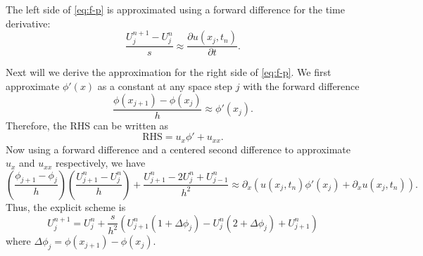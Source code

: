 \documentclass[reqno,11pt]{amsart}
\newcommand{\rhs}{{\text{RHS}}}
\begin{document}
	The left side of \eqref{eq:f-p} is approximated using a forward difference for the time derivative:
	\begin{equation}
		\frac{U_j^{n+1} - U_j^n}{s} \approx \frac{\partial u (x_j,t_n)}{\partial t}.
	\end{equation}
	
	Next will we derive the approximation for the right side of \eqref{eq:f-p}.
	We first approximate $\phi'(x)$ as a constant at any space step $j$ with the forward difference
	\begin{equation}
		\frac{\phi(x_{j+1}) - \phi(x_j)}{h} \approx \phi'(x_j).
	\end{equation}
	Therefore, the RHS can be written as
	\begin{equation*}
		\rhs = u_x \phi' + u_{xx}.
	\end{equation*}
	Now using a forward difference and a centered second difference to approximate $u_x$ and $u_{xx}$ respectively, we have
	\begin{equation}
		\left( \frac{\phi_{j+1} - \phi_j}{h} \right) \left( \frac{U_{j+1}^n - U_j^n}{h} \right) + \frac{U_{j+1}^n - 2 U_j^n + U_{j-1}^n}{h^2} \approx \partial_x \left( u (x_j,t_n) \phi' (x_j) + \partial_x u (x_j,t_n) \right).
	\end{equation}
	Thus, the explicit scheme is
	\begin{equation}
		U_j^{n+1} = U_j^n + \frac{s}{h^2} \left( U_{j+1}^n (1 + \Delta \phi_j) - U_j^n (2 + \Delta \phi_j) + U_{j+1}^n \right)
	\end{equation}
	where $\Delta \phi_j = \phi(x_{j+1}) - \phi(x_j)$.
\end{document}
